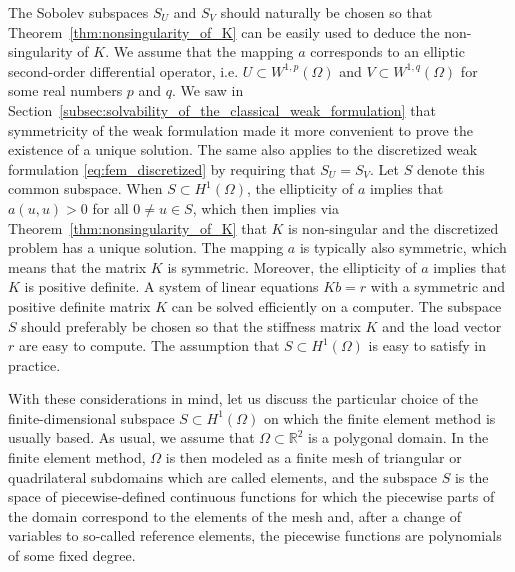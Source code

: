 \documentclass[english, 12pt, a4paper, sci, utf8, a-2b, online]{aaltothesis}
\theoremstyle{definition}
\theoremstyle{plain}
\numberwithin{equation}{section}
\begin{document}
The Sobolev subspaces $S_U$ and $S_V$ should naturally be chosen so that
Theorem~\ref{thm:nonsingularity_of_K} can be easily used to deduce
the non-singularity of $K$. We assume that the mapping $a$ corresponds
to an elliptic second-order differential operator, i.e.
$U \subset W^{1,p}(\Omega)$ and $V \subset W^{1,q}(\Omega)$
for some real numbers $p$ and $q$.
We saw in Section~\ref{subsec:solvability_of_the_classical_weak_formulation}
that symmetricity of the weak formulation made it more convenient to prove the
existence of a unique solution. The same also applies to the discretized
weak formulation \eqref{eq:fem_discretized} by requiring that $S_U = S_V$.
Let $S$ denote this common subspace.
When $S \subset H^1(\Omega)$, the ellipticity of $a$ implies that
$a(u,u) > 0$ for all $0 \neq u \in S$, which then implies
via Theorem~\ref{thm:nonsingularity_of_K} that $K$ is non-singular
and the discretized problem has a unique solution.
The mapping $a$ is typically also symmetric, which means that the
matrix $K$ is symmetric. Moreover, the ellipticity of $a$ implies that
$K$ is positive definite.
A system of linear equations $Kb = r$ with a symmetric and positive
definite matrix $K$ can be solved efficiently on a computer.
The subspace $S$ should preferably be chosen so that
the stiffness matrix $K$ and the load vector $r$ are easy to compute.
The assumption that $S \subset H^1(\Omega)$ is easy to satisfy in practice.

With these considerations in mind, let us discuss the particular choice of the 
finite-dimensional subspace $S \subset H^1(\Omega)$
on which the finite element method is usually based.
As usual, we assume that $\Omega \subset \mathbb{R}^2$ is a polygonal domain.
In the finite element method, $\Omega$ is then modeled as a finite
mesh of triangular or quadrilateral subdomains which are called elements,
and the subspace $S$ is the space of piecewise-defined continuous
functions for which the piecewise parts of the domain
correspond to the elements of the mesh and,
after a change of variables to so-called reference elements,
the piecewise functions are polynomials of some fixed degree.
\end{document}
